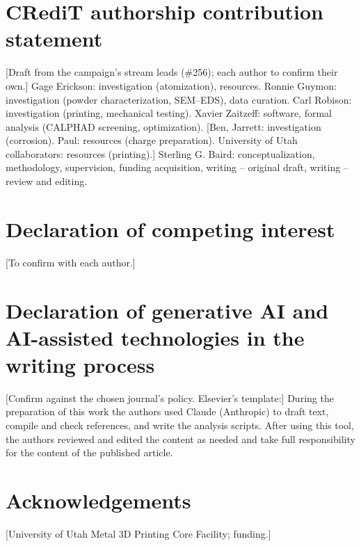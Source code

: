 \documentclass[preprint,12pt]{elsarticle}
\newcommand{\placeholder}[1]{\textcolor{red!75!black}{[#1]}}
\begin{document}
\fussy
\section*{CRediT authorship contribution statement}
\placeholder{Draft from the campaign's stream leads (\#256); each author to confirm their own.} Gage Erickson: investigation (atomization), resources. Ronnie Guymon: investigation (powder characterization, SEM--EDS), data curation. Carl Robison: investigation (printing, mechanical testing). Xavier Zaitzeff: software, formal analysis (CALPHAD screening, optimization). \placeholder{Ben, Jarrett: investigation (corrosion). Paul: resources (charge preparation). University of Utah collaborators: resources (printing).} Sterling G. Baird: conceptualization, methodology, supervision, funding acquisition, writing -- original draft, writing -- review and editing.

\section*{Declaration of competing interest}
\placeholder{To confirm with each author.}

\section*{Declaration of generative AI and AI-assisted technologies in the writing process}
\placeholder{Confirm against the chosen journal's policy. Elsevier's template:} During the preparation of this work the authors used Claude (Anthropic) to draft text, compile and check references, and write the analysis scripts. After using this tool, the authors reviewed and edited the content as needed and take full responsibility for the content of the published article.

\section*{Acknowledgements}
\placeholder{University of Utah Metal 3D Printing Core Facility; funding.}



\end{document}
